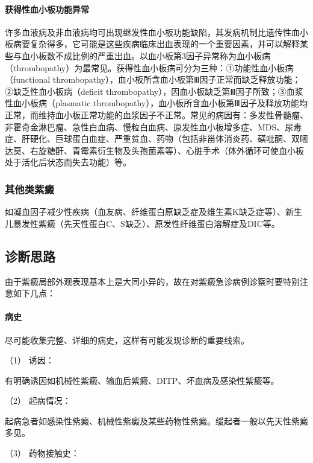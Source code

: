 \paragraph{获得性血小板功能异常}

许多血液病及非血液病均可出现继发性血小板功能缺陷，其发病机制比遗传性血小板病要复杂得多，它可能是这些疾病临床出血表现的一个重要因素，并可以解释某些与血小板数不成比例的严重出血。以血小板第3因子异常称为血小板病（thrombopathy）为最常见。获得性血小板病可分为三种：①功能性血小板病（functional
thrombopathy），血小板所含血小板第Ⅲ因子正常而缺乏释放功能；②缺乏性血小板病（deficit
thrombopathy），因血小板缺乏第Ⅲ因子所致；③血浆性血小板病（plasmatic
thrombopathy），血小板所含血小板第Ⅲ因子及释放功能均正常，而维持血小板正常功能的血浆因子不正常。常见的病因有：多发性骨髓瘤、非霍奇金淋巴瘤、急性白血病、慢粒白血病、原发性血小板增多症、MDS、尿毒症、肝硬化、巨球蛋白血症、严重贫血、药物（包括非甾体消炎药、磺吡酮、双嘧达莫、右旋糖酐、青霉素衍生物及头孢菌素等）、心脏手术（体外循环可使血小板处于活化后状态而失去功能）等。

\subsubsection{其他类紫癜}

如凝血因子减少性疾病（血友病、纤维蛋白原缺乏症及维生素K缺乏症等）、新生儿暴发性紫癜（先天性蛋白C、S缺乏）、原发性纤维蛋白溶解症及DIC等。

\subsection{诊断思路}

由于紫癜局部外观表现基本上是大同小异的，故在对紫癜急诊病例诊察时要特别注意如下几点：

\paragraph{病史}

尽可能收集完整、详细的病史，这样有可能发现诊断的重要线索。

\hypertarget{text00036.htmlux5cux23CHP1-14-2-1-1}{}
（1） 诱因：

有明确诱因如机械性紫癜、输血后紫癜、DITP、坏血病及感染性紫癜等。

\hypertarget{text00036.htmlux5cux23CHP1-14-2-1-2}{}
（2） 起病情况：

起病急者如感染性紫癜、机械性紫癜及某些药物性紫癜。缓起者一般以先天性紫癜多见。

\hypertarget{text00036.htmlux5cux23CHP1-14-2-1-3}{}
（3） 药物接触史：

